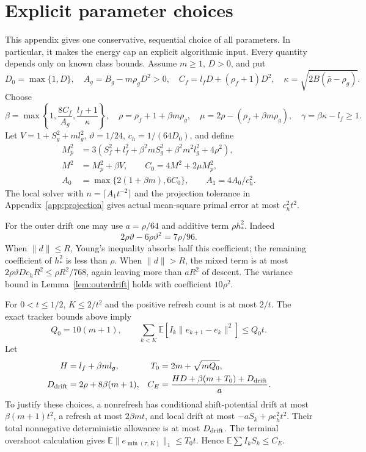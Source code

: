 \documentclass[11pt,a4paper]{article}
\newcommand{\E}{\mathbb E}
\theoremstyle{remark}
\numberwithin{equation}{section}
\begin{document}
\appendix
\section{Explicit parameter choices}\label{app:constants}
This appendix gives one conservative, sequential choice of all parameters. In particular, it makes the energy cap an explicit algorithmic input. Every quantity depends only on known class bounds. Assume $m\ge1$, $D>0$, and put
\[
 D_0=\max\{1,D\},\quad A_g=B_g-m\rho_gD^2>0,\quad
 C_f=l_fD+(\rho_f+1)D^2,\quad
 \kappa=\sqrt{2B(\bar\rho-\rho_g)}.
\]
Choose
\[
 \beta=\max\left\{1,\frac{8C_f}{A_g},\frac{l_f+1}{\kappa}\right\},\quad
 \rho=\rho_f+1+\beta m\rho_g,\quad
 \mu=2\rho-(\rho_f+\beta m\rho_g),\quad
 \gamma=\beta\kappa-l_f\ge1.
\]
Let $V=1+S_g^2+m l_g^2$, $\vartheta=1/24$, $c_h=1/(64D_0)$, and define
\begin{align*}
 M_p^2&=3(S_f^2+l_f^2+\beta^2mS_g^2+\beta^2m^2l_g^2+4\rho^2),\\
 M^2&=M_p^2+\beta V,\qquad C_0=4M^2+2\mu M_p^2,\\
 A_0&=\max\{2(1+\beta m),6C_0\},\qquad A_1=4A_0/c_h^2.
\end{align*}
The local solver with $n=\lceil A_1t^{-2}\rceil$ and the projection tolerance in Appendix~\ref{app:projection} gives actual mean-square primal error at most $c_h^2t^2$.

For the outer drift one may use $a=\rho/64$ and additive term $\rho h_*^2$. Indeed
\[
 2\rho\vartheta-6\rho\vartheta^2=7\rho/96.
\]
When $\|d\|\le R$, Young's inequality absorbs half this coefficient; the remaining coefficient of $h_*^2$ is less than $\rho$. When $\|d\|>R$, the mixed term is at most
$2\rho\vartheta D c_h R^2\le\rho R^2/768$, again leaving more than $aR^2$ of descent. The variance bound in Lemma~\ref{lem:outerdrift} holds with coefficient $10\rho^2$.

For $0<t\le1/2$, $K\le2/t^2$ and the positive refresh count is at most $2/t$. The exact tracker bounds above imply
\[
 Q_0=10(m+1),\qquad
 \sum_{k<K}\E[I_k\|e_{k+1}-e_k\|^2]\le Q_0t.
\]
Let
\begin{align*}
 H&=l_f+\beta m l_g, & T_0&=2m+\sqrt{mQ_0},\\
 D_{\rm drift}&=2\rho+8\beta(m+1), &
 C_E&=\frac{HD+\beta(m+T_0)+D_{\rm drift}}{a}.
\end{align*}
To justify these choices, a nonrefresh has conditional shift-potential drift at most $\beta(m+1)t^2$, a refresh at most $2\beta mt$, and local drift at most $-aS_k+\rho c_h^2t^2$. Their total nonnegative deterministic allowance is at most $D_{\rm drift}$. The terminal overshoot calculation gives
$\E\|e_{\min(\tau,K)}\|_1\le T_0t$. Hence $\E\sum I_kS_k\le C_E$.
\end{document}
